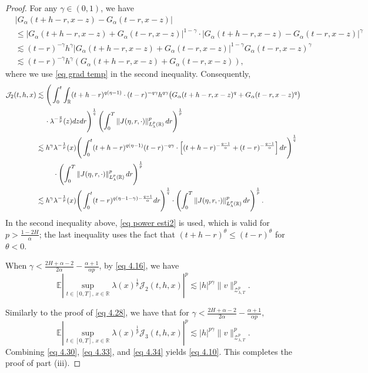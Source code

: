 \documentclass[11pt,reqno]{amsart}
\numberwithin{equation}{section}
\newcommand{\1}{{\bf 1}}
\newcommand{\2}{{\bf 2}}
\begin{document}
\begin{proof}
For any $\gamma\in(0,1)$, we have
\begin{align*}
&\big|G_{\alpha}(t+h-r,x-z)-G_{\alpha}(t-r,x-z)\big|\\
&\le\big|G_{\alpha}(t+h-r,x-z)+G_{\alpha}(t-r,x-z)\big|^{1-\gamma}\cdot \big|G_{\alpha}(t+h-r,x-z)-G_{\alpha}(t-r,x-z)\big|^{\gamma}\\
&\lesssim (t-r)^{-\gamma}h^{\gamma}\big|G_{\alpha}(t+h-r,x-z)+G_{\alpha}(t-r,x-z)\big|^{1-\gamma}G_{\alpha}(t-r,x-z)^{\gamma}\\
&\lesssim  (t-r)^{-\gamma}h^{\gamma}\left(G_{\alpha}(t+h-r,x-z)+G_{\alpha}(t-r,x-z)\right),
\end{align*}
where we use  \eqref{eq grad temp} in the second inequality. Consequently, 
\begin{align*}
\mathcal{J}_2(t, h, x)&\lesssim \Bigg(\int_0^t\int_{\mathbb{R}} (t+h-r)^{q(\eta-1)} \cdot(t-r)^{-q\gamma}h^{q\gamma}\big(G_{\alpha}(t+h-r,x-z)^{q}+G_{\alpha}(t-r,x-z)^{q}\big)\nonumber\\
&\hskip12pt\cdot\lambda^{-\frac{q}{p}}(z)dzdr\Bigg)^{\frac1q}\left(\int_0^T\left\|J(\eta,r,\cdot)\right\|^p_{L_\lambda^p(\mathbb{R})}dr\right)^{\frac1p}\nonumber\\
&\lesssim h^{\gamma}\lambda^{-\frac1p}(x)\Bigg(\int_0^t(t+h-r)^{q(\eta-1)} (t-r)^{-q\gamma} \cdot\left[(t+h-r)^{-\frac{q-1}{\alpha}}+(t-r)^{-\frac{q-1}{\alpha}}\right]dr\Bigg)^{\frac1q}\\
&\hskip24pt\cdot\left(\int_0^T\left\|J(\eta,r,\cdot)\right\|^p_{L_\lambda^p(\mathbb{R})}dr\right)^{\frac1p}\\
&\lesssim h^{\gamma}\lambda^{-\frac1p}(x)\Bigg(\int_0^t(t-r)^{q(\eta-1-\gamma)-\frac{q-1}{\alpha}}  dr\Bigg)^{\frac1q}\cdot\left(\int_0^T\left\|J(\eta,r,\cdot)\right\|^p_{L_\lambda^p(\mathbb{R})}dr\right)^{\frac1p}.
\end{align*}
In the second inequality above,   \eqref{eq power esti2}  is used, which is valid for  $p>\frac{1-2H}{\alpha}$; the last inequality  uses the fact that   $(t+h-r)^{\theta}\le (t-r)^{\theta}$ for $\theta<0$.

  When  $\gamma<\frac{2H+\alpha-2}{2\alpha}-\frac{\alpha+1}{\alpha p}$, by \eqref{eq 4.16},  we have
\begin{equation}\label{eq 4.33}
\mathbb{E}\left|\sup_{t\in [0,T],\, x\in \mathbb R}\lambda(x)^{\frac1p}\mathcal{J}_2(t,h,x)\right|^p\lesssim |h|^{p\gamma}\|v\|_{\mathcal{Z}_{\lambda,T}^p}^p.
\end{equation}

Similarly to the proof of \eqref{eq 4.28}, we have that for $\gamma<\frac{2H+\alpha-2}{2\alpha}-\frac{\alpha+1}{\alpha p},$
\begin{equation}\label{eq 4.34}
\mathbb{E}\left|\sup_{t\in [0,T],\, x\in \mathbb R}\lambda(x)^{\frac1p}\mathcal{J}_3(t,h,x)\right|^p\lesssim |h|^{p\gamma}\|v\|_{\mathcal{Z}_{\lambda,T}^p}^p.
\end{equation}
Combining \eqref{eq 4.30}, \eqref{eq 4.33}, and \eqref{eq 4.34} yields    \eqref{eq 4.10}. This completes the proof of part (iii).


\end{proof}
\end{document}
